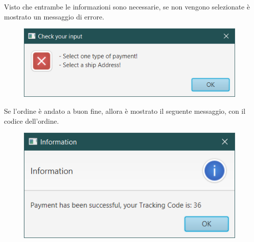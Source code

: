 \documentclass[a4paper,11pt]{report}
\begin{document}
Visto che entrambe le informazioni sono necessarie, se non vengono selezionate è mostrato un messaggio di errore.

\begin{figure}[h!]
	\centering
	\includegraphics[width=0.5\linewidth]{Screenshots/paymentErrore.png}
\end{figure}

Se l'ordine è andato a buon fine, allora è mostrato il seguente messaggio, con il codice dell'ordine.

\begin{figure}[h!]
    \centering
	\includegraphics[width=0.4\linewidth]{Screenshots/alertOrdine.png}
\end{figure}
\end{document}
